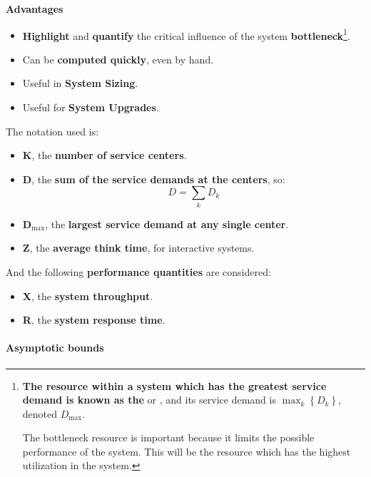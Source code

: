 \highspace
\begin{flushleft}
	\textcolor{Green4}{ \textbf{Advantages}}
\end{flushleft}
\begin{itemize}
	\item \textbf{Highlight} and \textbf{quantify} the critical influence of the system \textbf{bottleneck}\footnote{%
	\textbf{The resource within a system which has the greatest service demand is known as the}  or , and its service demand is $\max_{k}\left\{D_{k}\right\}$, denoted $D_{\max}$. 
	
	The bottleneck resource is important because it limits the possible performance of the system. This will be the resource which has the highest utilization in the system.%
	}.
	\item Can be \textbf{computed quickly}, even by hand.
	\item Useful in \textbf{System Sizing}.
	\item Useful for \textbf{System Upgrades}.
\end{itemize}

\highspace
The notation used is:
\begin{itemize}
	\item \textbf{K}, the \textbf{number of service centers}.
	
	\item \textbf{D}, the \textbf{sum of the service demands at the centers}, so:
	\begin{equation}
		D = \displaystyle\sum_{k}D_{k}
	\end{equation}
	
	\item $\mathbf{D}_{\max}$, the \textbf{largest service demand at any single center}.
	
	\item \textbf{Z}, the \textbf{average think time}, for interactive systems.
\end{itemize}
And the following \textbf{performance quantities} are considered:
\begin{itemize}
	\item \textbf{X}, the \textbf{system throughput}.
	
	\item \textbf{R}, the \textbf{system response time}.
\end{itemize}

\newpage

\paragraph{Asymptotic bounds}

